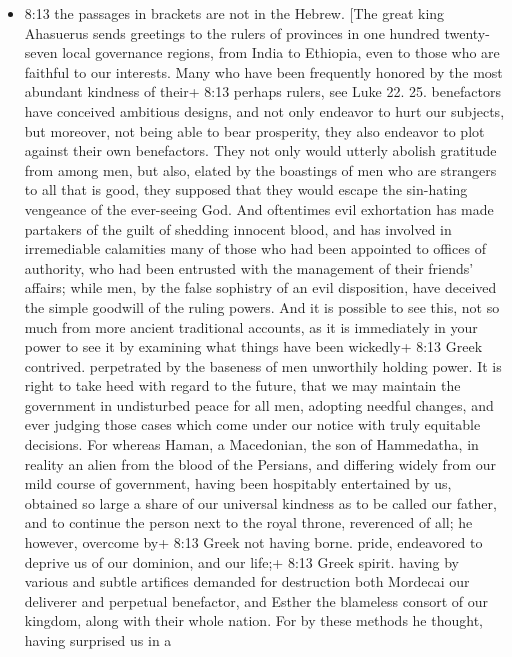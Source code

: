 \begin{itemize}
\tightlist
\item
  8:13 the passages in brackets are not in the Hebrew. {[}The great king
  Ahasuerus sends greetings to the rulers of provinces in one hundred
  twenty-seven local governance regions, from India to Ethiopia, even to
  those who are faithful to our interests. Many who have been frequently
  honored by the most abundant kindness of their+ 8:13 perhaps rulers,
  see Luke 22. 25. benefactors have conceived ambitious designs, and not
  only endeavor to hurt our subjects, but moreover, not being able to
  bear prosperity, they also endeavor to plot against their own
  benefactors. They not only would utterly abolish gratitude from among
  men, but also, elated by the boastings of men who are strangers to all
  that is good, they supposed that they would escape the sin-hating
  vengeance of the ever-seeing God. And oftentimes evil exhortation has
  made partakers of the guilt of shedding innocent blood, and has
  involved in irremediable calamities many of those who had been
  appointed to offices of authority, who had been entrusted with the
  management of their friends' affairs; while men, by the false
  sophistry of an evil disposition, have deceived the simple goodwill of
  the ruling powers. And it is possible to see this, not so much from
  more ancient traditional accounts, as it is immediately in your power
  to see it by examining what things have been wickedly+ 8:13 Greek
  contrived. perpetrated by the baseness of men unworthily holding
  power. It is right to take heed with regard to the future, that we may
  maintain the government in undisturbed peace for all men, adopting
  needful changes, and ever judging those cases which come under our
  notice with truly equitable decisions. For whereas Haman, a
  Macedonian, the son of Hammedatha, in reality an alien from the blood
  of the Persians, and differing widely from our mild course of
  government, having been hospitably entertained by us, obtained so
  large a share of our universal kindness as to be called our father,
  and to continue the person next to the royal throne, reverenced of
  all; he however, overcome by+ 8:13 Greek not having borne. pride,
  endeavored to deprive us of our dominion, and our life;+ 8:13 Greek
  spirit. having by various and subtle artifices demanded for
  destruction both Mordecai our deliverer and perpetual benefactor, and
  Esther the blameless consort of our kingdom, along with their whole
  nation. For by these methods he thought, having surprised us in a

\end{itemize}
